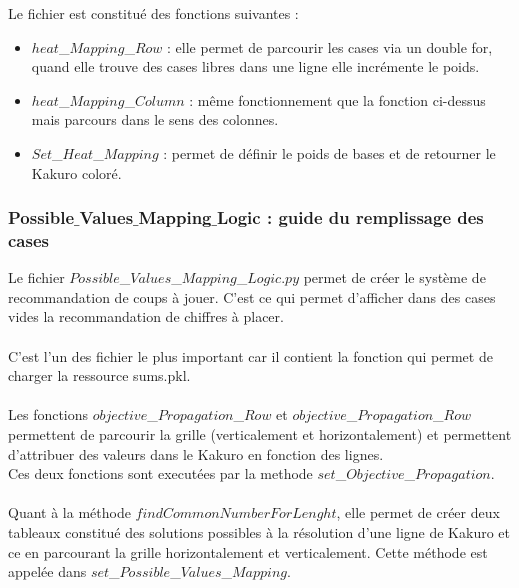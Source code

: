 \documentclass[french,12pt]{article}
\begin{document}
Le fichier est constitué des fonctions suivantes : \\
\begin{itemize}

\item[]$heat$\_$Mapping$\_$Row$ : elle permet de parcourir les cases via un double for, quand elle trouve des cases libres dans  une ligne elle incrémente le poids. \\

\item[]$heat$\_$Mapping$\_$Column$ : même fonctionnement que la fonction ci-dessus mais parcours dans le sens des colonnes. \\

\item[]$Set$\_$Heat$\_$Mapping$ : permet de définir le poids de bases et de retourner le Kakuro coloré.\\
\end{itemize}

\subsubsection{Possible$\_$Values$\_$Mapping$\_$Logic : guide du remplissage des cases}
Le fichier $Possible$\_$Values$\_$Mapping$\_$Logic.py$ permet de créer le système de recommandation de coups à jouer. C'est ce qui permet d'afficher dans des cases vides la recommandation de chiffres à placer. \\ \\
C'est l'un des fichier le plus important car il contient la fonction qui permet de charger la ressource sums.pkl. \\ \\

Les fonctions $objective$\_$Propagation$\_$Row$ et $objective$\_$Propagation$\_$Row$ permettent de parcourir la grille (verticalement et horizontalement) et permettent d'attribuer des valeurs dans le Kakuro en fonction des lignes. \\
Ces deux fonctions sont executées par la methode $set$\_$Objective$\_$Propagation$. \\ \\
Quant à la méthode $findCommonNumberForLenght$, elle permet de créer deux tableaux constitué des solutions possibles à la résolution d'une ligne de Kakuro et ce en parcourant la grille horizontalement et verticalement. Cette méthode est appelée dans $set$\_$Possible$\_$Values$\_$Mapping$. 
\end{document}
